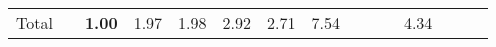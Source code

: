 \begin{tabular}{ll|rrrrrr|rrrrrrr}
  \hline
  Total  & &



  


  
  \textbf{1.00} & 1.97 & 1.98 & 2.92 & 2.71 & 7.54 &  &  &  & 4.34 &  \\


\end{tabular}
